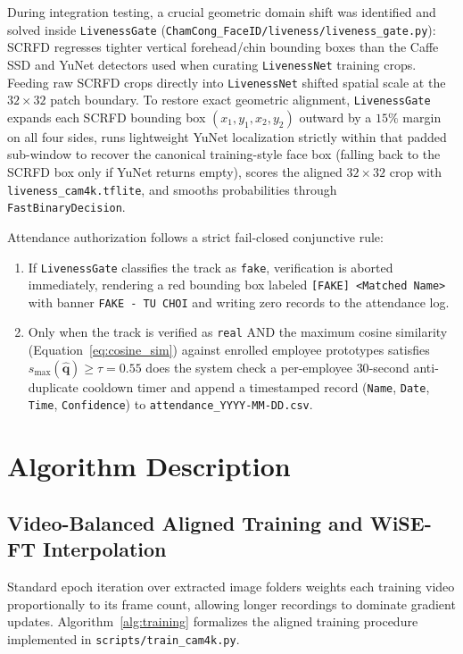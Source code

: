 During integration testing, a crucial geometric domain shift was identified and solved inside \texttt{LivenessGate} (\texttt{ChamCong\_FaceID/liveness/liveness\_gate.py}): SCRFD regresses tighter vertical forehead/chin bounding boxes than the Caffe SSD and YuNet detectors used when curating \texttt{LivenessNet} training crops. Feeding raw SCRFD crops directly into \texttt{LivenessNet} shifted spatial scale at the $32\times32$ patch boundary. To restore exact geometric alignment, \texttt{LivenessGate} expands each SCRFD bounding box $(x_1, y_1, x_2, y_2)$ outward by a $15\%$ margin on all four sides, runs lightweight YuNet localization strictly within that padded sub-window to recover the canonical training-style face box (falling back to the SCRFD box only if YuNet returns empty), scores the aligned $32\times32$ crop with \texttt{liveness\_cam4k.tflite}, and smooths probabilities through \texttt{FastBinaryDecision}.

Attendance authorization follows a strict fail-closed conjunctive rule:
\begin{enumerate}
    \item If \texttt{LivenessGate} classifies the track as \texttt{fake}, verification is aborted immediately, rendering a red bounding box labeled \texttt{[FAKE] <Matched Name>} with banner \texttt{FAKE - TU CHOI} and writing zero records to the attendance log.
    \item Only when the track is verified as \texttt{real} AND the maximum cosine similarity (Equation~\eqref{eq:cosine_sim}) against enrolled employee prototypes satisfies $s_{\max}(\hat{\mathbf{q}}) \ge \tau = 0.55$ does the system check a per-employee $30$-second anti-duplicate cooldown timer and append a timestamped record (\texttt{Name}, \texttt{Date}, \texttt{Time}, \texttt{Confidence}) to \texttt{attendance\_YYYY-MM-DD.csv}.
\end{enumerate}

\section{Algorithm Description}
\label{sec:algorithm_description}

\subsection{Video-Balanced Aligned Training and WiSE-FT Interpolation}

Standard epoch iteration over extracted image folders weights each training video proportionally to its frame count, allowing longer recordings to dominate gradient updates. Algorithm~\ref{alg:training} formalizes the aligned training procedure implemented in \texttt{scripts/train\_cam4k.py}.

